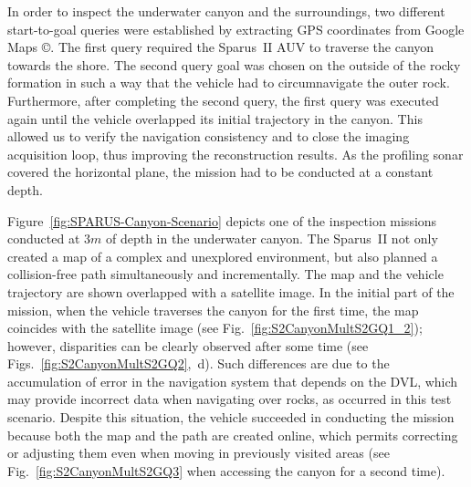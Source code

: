 In order to inspect the underwater canyon and the surroundings, two different
start-to-goal queries were established by extracting GPS coordinates from Google
Maps \copyright. The first query required the Sparus~II \ac{AUV} to traverse the
canyon towards the shore. The second query goal was chosen on the outside of the
rocky formation in such a way that the vehicle had to circumnavigate the outer
rock. Furthermore, after completing the second query, the first query was
executed again until the vehicle overlapped its initial trajectory in the
canyon. This allowed us to verify the navigation consistency and to close the
imaging acquisition loop, thus improving the reconstruction results. As the
profiling sonar covered the horizontal plane, the mission had to be conducted at
a constant depth.

Figure~\ref{fig:SPARUS-Canyon-Scenario} depicts one of the inspection missions
conducted at $3m$ of depth in the underwater canyon. The Sparus~II not only
created a map of a complex and unexplored environment, but also planned a
collision-free path simultaneously and incrementally. The map and the vehicle
trajectory are shown overlapped with a satellite image. In the initial part of the
mission, \ie when the vehicle traverses the canyon for the first time, the map
coincides with the satellite image (see
Fig.~\ref{fig:S2CanyonMultS2GQ1_2}); however, disparities can be
clearly observed after some time (see
Figs.~\ref{fig:S2CanyonMultS2GQ2},~d). Such differences are due to
the accumulation of error in the navigation system that depends on the \ac{DVL},
which may provide incorrect data when navigating over rocks, as occurred in this
test scenario. Despite this situation, the vehicle succeeded in conducting the
mission because both the map and the path are created online, which permits
correcting or adjusting them even when moving in previously visited areas (see
Fig.~\ref{fig:S2CanyonMultS2GQ3} when accessing the canyon for a
second time).

